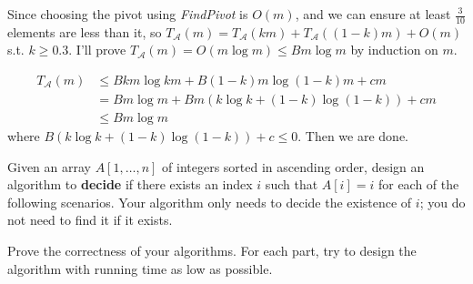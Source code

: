 \documentclass{oxmathproblems}
\begin{document}
\begin{questions}
\begin{Solution}
    Since choosing the pivot using \emph{FindPivot} is $O(m)$, and we can ensure at least $\frac{3}{10}$ elements are less than it, so $T_\mathcal{A}(m)=T_\mathcal{A}(km)+T_\mathcal{A}((1-k)m)+O(m)$ s.t. $k\geq 0.3$. I'll prove $T_\mathcal{A}(m)=O(m\log m)\leq Bm\log m$ by induction on $m$.

    \begin{align*}
        T_\mathcal{A}(m)&\leq Bkm\log km + B(1-k)m\log(1-k)m + cm\\
        &=Bm\log m + Bm(k\log k + (1-k)\log(1-k)) + cm\\
        &\leq Bm\log m
    \end{align*}
    where $B(k\log k + (1-k)\log(1-k)) + c\leq 0$. Then we are done.
    
\end{Solution}

\miquestion[25]
Given an array $A[1,\ldots,n]$ of integers sorted in ascending order, design an algorithm to \textbf{decide} if there exists an index $i$ such that $A[i]=i$ for each of the following scenarios. Your algorithm only needs to decide the existence of $i$; you do not need to find it if it exists.
Prove the correctness of your algorithms. For each part, try to design the algorithm with running time as low as possible.

\begin{Solution}


\end{Solution}
\end{questions}
\end{document}
